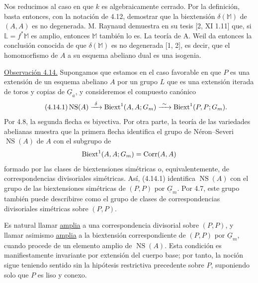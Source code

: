 Nos reducimos al caso en que $k$ es algebraicamente cerrado. Por la
definición, basta entonces, con la notación de 4.12, demostrar que la
biextensión $\delta(\mathbb M)$ de $(A,A)$ es no degenerada. M. Raynaud
demuestra en su tesis [2, XI 1.11] que, si
$\mathbb L=f^*\mathbb M$ es amplio, entonces $\mathbb M$ también lo es.
La teoría de A. Weil da entonces la conclusión conocida de que
$\delta(\mathbb M)$ es no degenerada [1, 2], es decir, que el
homomorfismo de $A$ a su esquema abeliano dual es una isogenia.


\medskip
\noindent\underline{Observación 4.14.} Supongamos que estamos en el
caso favorable en que $P$ es una extensión de un esquema abeliano $A$
por un grupo $L$ que es una extensión iterada de toros y copias de
$\underline G_a$, y consideremos el compuesto canónico
\begin{equation}\tag{4.14.1}
 \operatorname{NS}(A)
 \xrightarrow{\ \delta\ }
 \operatorname{Biext}^1(A,A;G_m)
 \xrightarrow{\ \sim\ }
 \operatorname{Biext}^1(P,P;G_m).
\end{equation}
Por 4.8, la segunda flecha es biyectiva. Por otra parte, la teoría de
las variedades abelianas muestra que la primera flecha identifica el
grupo de Néron--Severi $\operatorname{NS}(A)$ de $A$ con el subgrupo de
\[
 \operatorname{Biext}^1(A,A;G_m)=\operatorname{Corr}(A,A)
\]
formado por las clases de biextensiones simétricas o,
equivalentemente, de correspondencias divisoriales simétricas. Así,
(4.14.1) identifica $\operatorname{NS}(A)$ con el grupo de las
biextensiones simétricas de $(P,P)$ por $\underline G_m$. Por 4.7,
este grupo también puede describirse como el grupo de clases de
correspondencias divisoriales simétricas sobre $(P,P)$.

Es natural llamar \underline{amplia} a una correspondencia divisorial
sobre $(P,P)$, y llamar asimismo \underline{amplia} a la biextensión
correspondiente de $(P,P)$ por $\underline G_m$, cuando procede de un
elemento amplio de $\operatorname{NS}(A)$. Esta condición es
manifiestamente invariante por extensión del cuerpo base; por tanto, la
noción sigue teniendo sentido sin la hipótesis restrictiva precedente
sobre $P$, suponiendo solo que $P$ es liso y conexo.


